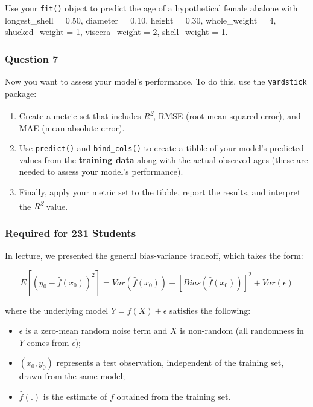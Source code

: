 \documentclass[
]{article}
\providecommand{\tightlist}{%
  \setlength{\itemsep}{0pt}\setlength{\parskip}{0pt}}
\begin{document}
Use your \texttt{fit()} object to predict the age of a hypothetical
female abalone with longest\_shell = 0.50, diameter = 0.10, height =
0.30, whole\_weight = 4, shucked\_weight = 1, viscera\_weight = 2,
shell\_weight = 1.

\hypertarget{question-7}{%
\subsubsection{Question 7}\label{question-7}}

Now you want to assess your model's performance. To do this, use the
\texttt{yardstick} package:

\begin{enumerate}
\def\labelenumi{\arabic{enumi}.}
\tightlist
\item
  Create a metric set that includes \emph{R\textsuperscript{2}}, RMSE
  (root mean squared error), and MAE (mean absolute error).
\item
  Use \texttt{predict()} and \texttt{bind\_cols()} to create a tibble of
  your model's predicted values from the \textbf{training data} along
  with the actual observed ages (these are needed to assess your model's
  performance).
\item
  Finally, apply your metric set to the tibble, report the results, and
  interpret the \emph{R\textsuperscript{2}} value.
\end{enumerate}

\hypertarget{required-for-231-students}{%
\subsubsection{Required for 231
Students}\label{required-for-231-students}}

In lecture, we presented the general bias-variance tradeoff, which takes
the form:

\[
E[(y_0 - \hat{f}(x_0))^2]=Var(\hat{f}(x_0))+[Bias(\hat{f}(x_0))]^2+Var(\epsilon)
\]

where the underlying model \(Y=f(X)+\epsilon\) satisfies the following:

\begin{itemize}
\tightlist
\item
  \(\epsilon\) is a zero-mean random noise term and \(X\) is non-random
  (all randomness in \(Y\) comes from \(\epsilon\));
\item
  \((x_0, y_0)\) represents a test observation, independent of the
  training set, drawn from the same model;
\item
  \(\hat{f}(.)\) is the estimate of \(f\) obtained from the training
  set.
\end{itemize}
\end{document}
